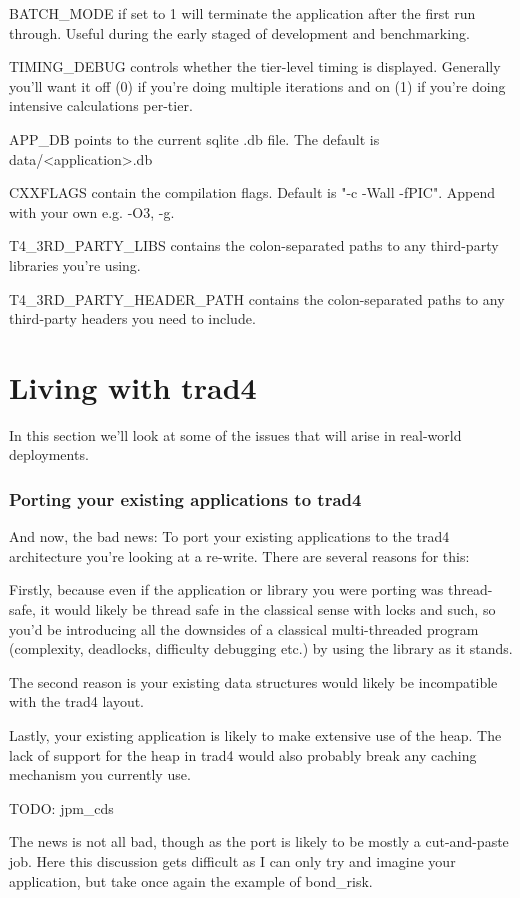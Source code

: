 \documentclass{report}
\begin{document}
BATCH_MODE if set to 1 will terminate the application after the first run through. Useful during the early staged of development and benchmarking.

TIMING_DEBUG controls whether the tier-level timing is displayed. Generally you'll want it off  (0) if you're doing multiple iterations and on (1) if you're doing intensive calculations per-tier.

APP_DB points to the current sqlite .db file. The default is data/<application>.db

CXXFLAGS contain the compilation flags. Default is "-c -Wall -fPIC". Append with your own e.g.  -O3, -g.

T4_3RD_PARTY_LIBS contains the colon-separated paths to any third-party libraries you're using.

T4_3RD_PARTY_HEADER_PATH contains the colon-separated paths to any third-party headers you need to include.

\chapter{Living with trad4}

In this section we'll look at some of the issues that will arise in real-world deployments.

\subsection{Porting your existing applications to trad4}

And now, the bad news: To port your existing applications to the trad4 architecture you're looking at a re-write. There are several reasons for this:

Firstly, because even if the application or library you were porting was thread-safe, it would likely be thread safe in the classical sense with locks and such, so you'd be introducing all the downsides of a classical multi-threaded program (complexity, deadlocks, difficulty debugging etc.) by using the library as it stands.

The second reason is your existing data structures would likely be incompatible with the trad4 
layout.

Lastly, your existing application is likely to make extensive use of the heap. The lack of support for the heap in trad4 would also probably break any caching mechanism you currently use.

TODO: jpm_cds

The news is not all bad, though as the port is likely to be mostly a cut-and-paste job. Here this discussion gets difficult as I can only try and imagine your application, but take once again the example of bond_risk.
\end{document}
